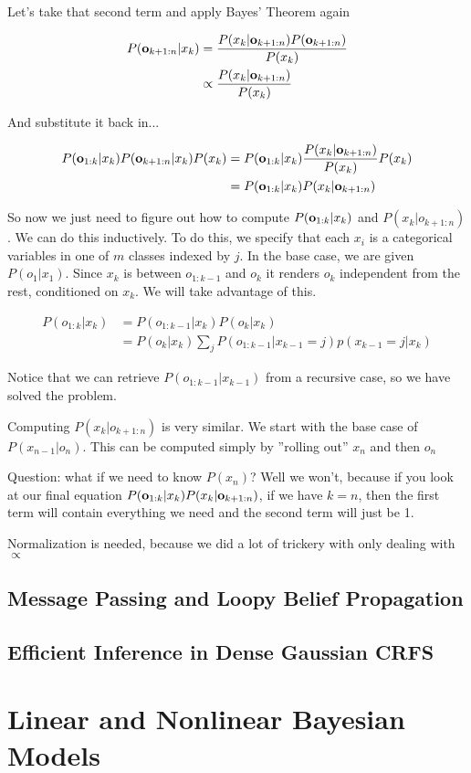 \documentclass[12pt]{article}
\newcommand{\eq}[1]{\begin{align*}#1\end{align*}}
\begin{document}
Let's take that second term and apply Bayes' Theorem again

\eq{
  P(\o_{k+1:n}|x_k) &= \frac{P(x_k | \o_{k+1:n}) P(\o_{k+1:n})}{P(x_k)} \\
  &\propto \frac{P(x_k | \o_{k+1:n})}{P(x_k)}
}

And substitute it back in...

\eq{
  P(\o_{1:k}|x_k)P(\o_{k+1:n}|x_k)P(x_k) &= P(\o_{1:k}|x_k)\frac{P(x_k | \o_{k+1:n})}{P(x_k)}P(x_k)\\
  &= P(\o_{1:k}|x_k)P(x_k | \o_{k+1:n})
}

So now we just need to figure out how to compute $P(\mathbf{o}_{1:k}|x_k)$ and $P(x_k|o_{k+1:n})$. We can do this inductively. To do this, we specify that each $x_i$ is a categorical variables in one of $m$ classes indexed by $j$. In the base case, we are given $P(o_1 | x_1)$. Since $x_k$ is between $o_{1:k-1}$ and $o_k$ it renders $o_k$ independent from the rest, conditioned on $x_k$. We will take advantage of this.

\eq{
  P(o_{1:k}|x_k) &= P(o_{1:k-1}|x_k)P(o_k|x_k) \\
  & = P(o_k|x_k) \sum_j P(o_{1:k-1}|x_{k-1} = j)p(x_{k-1} = j|x_k)
}

Notice that we can retrieve $P(o_{1:k-1}|x_{k-1})$ from a recursive case, so we have solved the problem.

Computing $P(x_k|o_{k+1:n})$ is very similar. We start with the base case of $P(x_{n-1}|o_n)$. This can be computed simply by ''rolling out'' $x_n$ and then $o_n$

Question: what if we need to know $P(x_n)$? Well we won't, because if you look at our final equation $P(\mathbf{o}_{1:k}|x_k)P(x_k | \mathbf{o}_{k+1:n})$, if we have $k = n$, then the first term will contain everything we need and the second term will just be 1. 

Normalization is needed, because we did a lot of trickery with only dealing with $\propto$

\subsection{Message Passing and Loopy Belief Propagation}

\subsection{Efficient Inference in Dense Gaussian CRFS}

\section{Linear and Nonlinear Bayesian Models}
\end{document}
